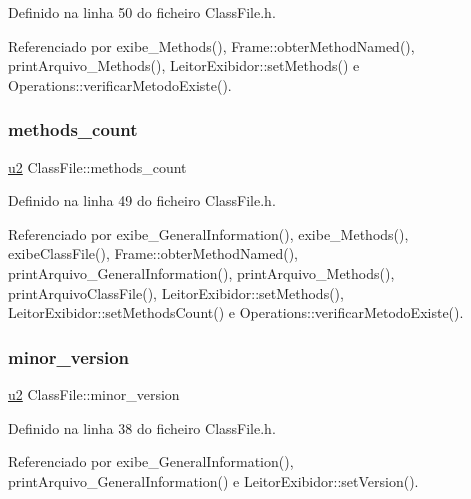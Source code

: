 Definido na linha 50 do ficheiro Class\+File.\+h.



Referenciado por exibe\+\_\+\+Methods(), Frame\+::obter\+Method\+Named(), print\+Arquivo\+\_\+\+Methods(), Leitor\+Exibidor\+::set\+Methods() e Operations\+::verificar\+Metodo\+Existe().

\mbox{\label{classClassFile_aacfb45d4af64216324b1ae5269c870d5}} 
\subsubsection{\texorpdfstring{methods\+\_\+count}{methods\_count}}
{\footnotesize\ttfamily \hyperlink{BasicTypes_8h_a732cde1300aafb73b0ea6c2558a7a54f}{u2} Class\+File\+::methods\+\_\+count}



Definido na linha 49 do ficheiro Class\+File.\+h.



Referenciado por exibe\+\_\+\+General\+Information(), exibe\+\_\+\+Methods(), exibe\+Class\+File(), Frame\+::obter\+Method\+Named(), print\+Arquivo\+\_\+\+General\+Information(), print\+Arquivo\+\_\+\+Methods(), print\+Arquivo\+Class\+File(), Leitor\+Exibidor\+::set\+Methods(), Leitor\+Exibidor\+::set\+Methods\+Count() e Operations\+::verificar\+Metodo\+Existe().

\mbox{\label{classClassFile_af0db7b0ea01cb9cea2cee177ca81df09}} 
\subsubsection{\texorpdfstring{minor\+\_\+version}{minor\_version}}
{\footnotesize\ttfamily \hyperlink{BasicTypes_8h_a732cde1300aafb73b0ea6c2558a7a54f}{u2} Class\+File\+::minor\+\_\+version}



Definido na linha 38 do ficheiro Class\+File.\+h.



Referenciado por exibe\+\_\+\+General\+Information(), print\+Arquivo\+\_\+\+General\+Information() e Leitor\+Exibidor\+::set\+Version().

